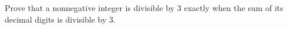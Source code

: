 Prove that a nonnegative integer is divisible by $3$ exactly when the sum of its decimal digits is divisible by $3$.
